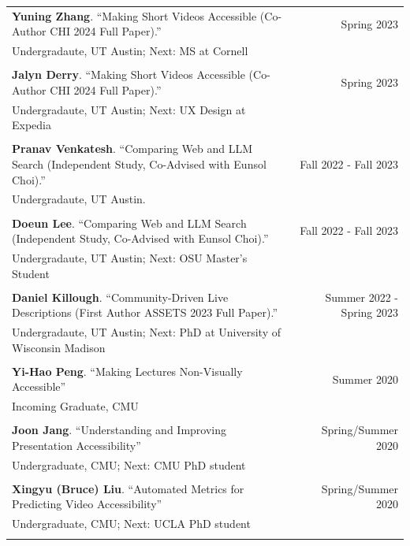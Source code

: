 \begin{longtable}{Xr}
	\textbf{Yuning Zhang}. ``Making Short Videos Accessible (Co-Author CHI 2024 Full Paper).'' & Spring 2023 \\
	Undergradaute, UT Austin; Next: MS at Cornell &  \\
	\\

	\textbf{Jalyn Derry}. ``Making Short Videos Accessible (Co-Author CHI 2024 Full Paper).'' & Spring 2023 \\
	Undergradaute, UT Austin; Next: UX Design at Expedia &  \\
	\\

	\textbf{Pranav Venkatesh}. ``Comparing Web and LLM Search (Independent Study, Co-Advised with Eunsol Choi).'' & Fall 2022 - Fall 2023 \\
	Undergradaute, UT Austin. &  \\
	\\

	\textbf{Doeun Lee}. ``Comparing Web and LLM Search (Independent Study, Co-Advised with Eunsol Choi).'' & Fall 2022 - Fall 2023 \\
	Undergradaute, UT Austin; Next: OSU Master's Student &  \\
	\\

	\textbf{Daniel Killough}. ``Community-Driven Live Descriptions (First Author ASSETS 2023 Full Paper).'' & Summer 2022 - Spring 2023 \\
	Undergradaute, UT Austin; Next: PhD at University of Wisconsin Madison &  \\
	\\

	\textbf{Yi-Hao Peng}. ``Making Lectures Non-Visually Accessible'' & Summer 2020 \\
	Incoming Graduate, CMU &  \\
	\\

	\textbf{Joon Jang}. ``Understanding and Improving Presentation Accessibility'' & Spring/Summer 2020 \\
	Undergraduate, CMU; Next: CMU PhD student &  \\
	\\

	\textbf{Xingyu (Bruce) Liu}. ``Automated Metrics for Predicting Video Accessibility'' & Spring/Summer 2020 \\
	Undergraduate, CMU; Next: UCLA PhD student &  \\
	\\


\end{longtable}
